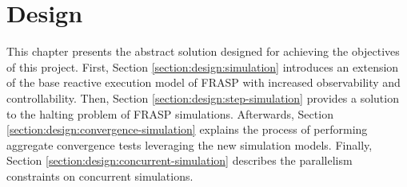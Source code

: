 
\chapter{Design}
\label{chapter:design}

This chapter presents the abstract solution designed for achieving the
objectives of this project. First, Section \ref{section:design:simulation}
introduces an extension of the base reactive execution model of FRASP with
increased observability and controllability. Then, Section
\ref{section:design:step-simulation} provides a solution to the halting problem
of FRASP simulations. Afterwards, Section
\ref{section:design:convergence-simulation} explains the process of performing
aggregate convergence tests leveraging the new simulation models. Finally,
Section \ref{section:design:concurrent-simulation} describes the parallelism
constraints on concurrent simulations.




